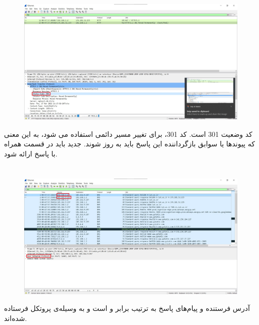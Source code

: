 \documentclass{article}
\begin{document}
\subsection{}
\begin{figure}[H]
    \centering
    \includegraphics[width=1.0\textwidth]{figures/45.jpg}
    \caption{}
    \label{fig:fig1}
\end{figure}
کد وضعیت 301 است. کد 301،   برای تغییر مسیر دائمی استفاده می شود، به این معنی که پیوندها یا سوابق بازگرداننده این پاسخ باید به روز شوند.  جدید باید در قسمت  همراه با پاسخ ارائه شود.



\section{}
\subsection{}
\begin{figure}[H]
    \centering
    \includegraphics[width=1.0\textwidth]{figures/51.jpg}
    \caption{}
    \label{fig:fig1}
\end{figure}
آدرس فرستنده  و پیام‌های پاسخ به ترتیب برابر  و  است و به وسیله‌ی پروتکل  فرستاده شده‌اند.
\end{document}
